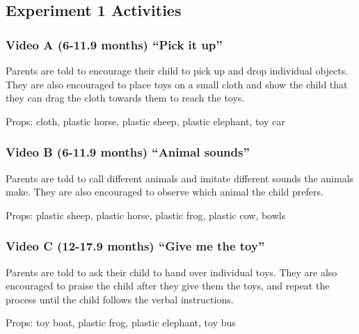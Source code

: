 \documentclass[man,floatsintext]{apa6}
\begin{document}
\begin{appendix}
\section{}
\hypertarget{experiment-1-activities}{%
\subsection{Experiment 1 Activities}\label{experiment-1-activities}}

\hypertarget{video-a-6-11.9-months-pick-it-up}{%
\subsubsection{Video A (6-11.9 months) ``Pick it
up''}\label{video-a-6-11.9-months-pick-it-up}}

Parents are told to encourage their child to pick up and drop individual
objects. They are also encouraged to place toys on a small cloth and
show the child that they can drag the cloth towards them to reach the
toys.

Props: cloth, plastic horse, plastic sheep, plastic elephant, toy car

\hypertarget{video-b-6-11.9-months-animal-sounds}{%
\subsubsection{Video B (6-11.9 months) ``Animal
sounds''}\label{video-b-6-11.9-months-animal-sounds}}

Parents are told to call different animals and imitate different sounds
the animals make. They are also encouraged to observe which animal the
child prefers.

Props: plastic sheep, plastic horse, plastic frog, plastic cow, bowls

\hypertarget{video-c-12-17.9-months-give-me-the-toy}{%
\subsubsection{Video C (12-17.9 months) ``Give me the
toy''}\label{video-c-12-17.9-months-give-me-the-toy}}

Parents are told to ask their child to hand over individual toys. They
are also encouraged to praise the child after they give them the toys,
and repeat the process until the child follows the verbal instructions.

Props: toy boat, plastic frog, plastic elephant, toy bus


\end{appendix}
\end{document}
